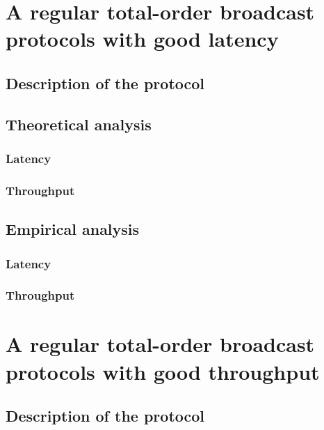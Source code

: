 \documentclass[a4paper]{article}
\begin{document}
\section{A regular total-order broadcast protocols with good latency}

\subsection{Description of the protocol}

\subsection{Theoretical analysis}

\subsubsection*{Latency}

\subsubsection*{Throughput}

\subsection{Empirical analysis}

\subsubsection*{Latency}

\subsubsection*{Throughput}

\section{A regular total-order broadcast protocols with good throughput}

\subsection{Description of the protocol}
\end{document}
